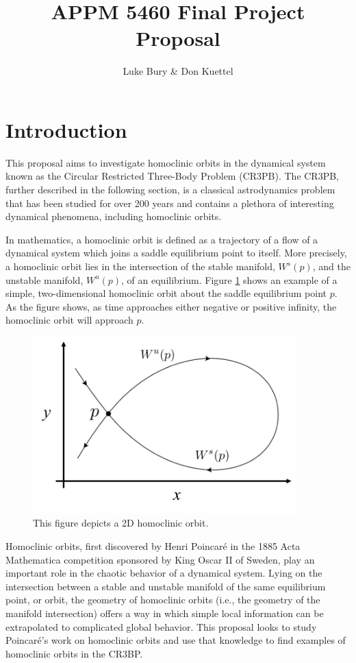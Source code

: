 \documentclass[12pt]{article} %
\title{APPM 5460 Final Project Proposal}
\author{Luke Bury \& Don Kuettel}
\begin{document}
\maketitle
\section*{Introduction}
This proposal aims to investigate homoclinic orbits in the dynamical system known as the Circular Restricted Three-Body Problem (CR3PB). The CR3PB, further described in the following section, is a classical astrodynamics problem that has been studied for over 200 years and contains a plethora of interesting dynamical phenomena, including homoclinic orbits. 

In mathematics, a homoclinic orbit is defined as a trajectory of a flow of a dynamical system which joins a saddle equilibrium point to itself. More precisely, a homoclinic orbit lies in the intersection of the stable manifold, $W^s(p)$, and the unstable manifold, $W^u(p)$, of an equilibrium. Figure \ref{f:homoclinic_example} shows an example of a simple, two-dimensional homoclinic orbit about the saddle equilibrium point $p$. As the figure shows, as time approaches either negative or positive infinity, the homoclinic orbit will approach $p$. 

\begin{figure}[H]
    \centering
    \includegraphics[width=4in]{homoclinic_orbit.png}
    \caption{This figure depicts a 2D homoclinic orbit.}
    \label{f:homoclinic_example}
\end{figure}

Homoclinic orbits, first discovered by Henri Poincar\'{e} in the 1885 Acta Mathematica competition sponsored by King Oscar II of Sweden, play an important role in the chaotic behavior of a dynamical system. Lying on the intersection between a stable and unstable manifold of the same equilibrium point, or orbit, the geometry of homoclinic orbits (i.e., the geometry of the manifold intersection) offers a way in which simple local information can be extrapolated to complicated global behavior. This proposal looks to study Poincar\'{e}'s work on homoclinic orbits and use that knowledge to find examples of homoclinic orbits in the CR3BP.
\end{document}
